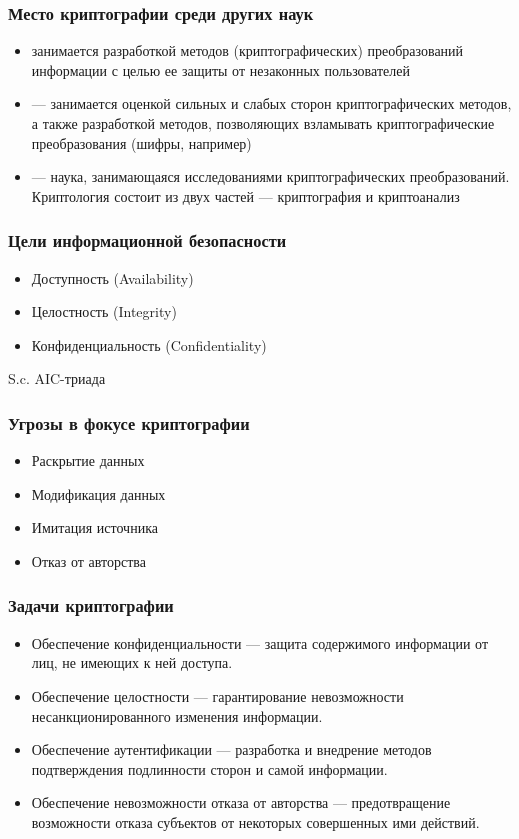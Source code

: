 \documentclass[a4paper, 14pt]{extarticle}
\begin{document}
\subsubsection*{Место криптографии среди других наук}
\begin{itemize}
    \item {} занимается разработкой методов (криптографических) преобразований информации с целью ее защиты от незаконных пользователей
    \item {} --- занимается оценкой сильных и слабых сторон криптографических методов, а также разработкой методов, позволяющих взламывать криптографические преобразования (шифры, например)
    \item {} --- наука, занимающаяся исследованиями криптографических преобразований. Криптология состоит из двух частей --- криптография и криптоанализ
\end{itemize}
\subsubsection*{Цели информационной безопасности}
\begin{itemize}
    \item Доступность (Availability)
    \item Целостность (Integrity)
    \item Конфиденциальность (Confidentiality)
\end{itemize}
S.c. AIC-триада

\subsubsection*{Угрозы в фокусе криптографии}
\begin{itemize}
    \item Раскрытие данных
    \item Модификация данных
    \item Имитация источника
    \item Отказ от авторства
\end{itemize}

\subsubsection*{Задачи криптографии}
\begin{itemize}
    \item Обеспечение конфиденциальности --- защита содержимого информации от лиц, не имеющих к ней доступа.
    \item Обеспечение целостности --- гарантирование невозможности несанкционированного изменения информации.
    \item Обеспечение аутентификации --- разработка и внедрение методов подтверждения подлинности сторон и самой информации.
    \item Обеспечение невозможности отказа от авторства --- предотвращение возможности отказа субъектов от некоторых совершенных ими действий.
\end{itemize}
\end{document}
